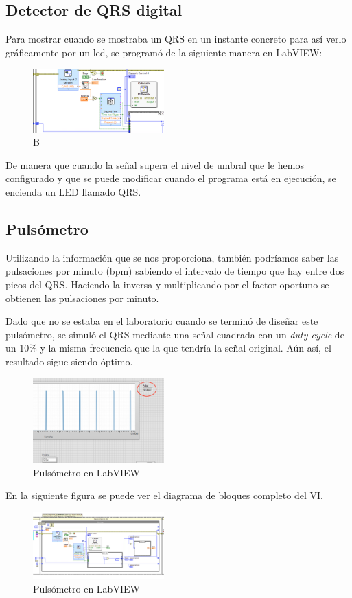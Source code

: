 \documentclass[conference]{IEEEtran}
\begin{document}
\subsection{Detector de QRS digital}
Para mostrar cuando se mostraba un QRS en un instante concreto para así verlo gráficamente por un led, se programó de la siguiente manera en LabVIEW:
\begin{figure}[H]
    \centerline{\includegraphics[width=0.45\textwidth]{e_diagramVI_QRS.png}}
    \caption{B}
    \end{figure}

De manera que cuando la señal supera el nivel de umbral que le hemos configurado y que se puede modificar cuando el programa está en ejecución, se encienda un LED llamado QRS.

\subsection{Pulsómetro}
Utilizando la información que se nos proporciona, también podríamos saber las pulsaciones por minuto (bpm) sabiendo el intervalo de tiempo que hay entre dos picos del QRS. Haciendo la inversa y multiplicando por el factor oportuno se obtienen las pulsaciones por minuto.

Dado que no se estaba en el laboratorio cuando se terminó de diseñar este pulsómetro, se simuló el QRS mediante una señal cuadrada con un \textit{duty-cycle} de un 10\% y la misma frecuencia que la que tendría la señal original. Aún así, el resultado sigue siendo óptimo.
\begin{figure}[H]
    \centerline{\includegraphics[width=0.45\textwidth]{e_pulsometro.png}}
    \caption{Pulsómetro en LabVIEW}
    \end{figure}

En la siguiente figura se puede ver el diagrama de bloques completo del VI.
\begin{figure}[H]
    \centerline{\includegraphics[width=0.45\textwidth]{e_diagramVI.png}}
    \caption{Pulsómetro en LabVIEW}
    \end{figure}
\end{document}
